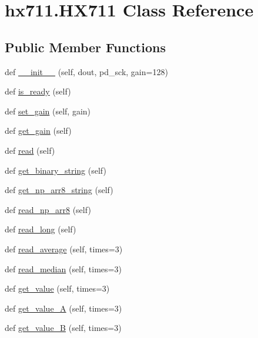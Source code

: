 \hypertarget{classhx711_1_1HX711}{}\section{hx711.\+H\+X711 Class Reference}
\label{classhx711_1_1HX711}
\subsection*{Public Member Functions}
\begin{DoxyCompactItemize}
\item 
def \hyperlink{classhx711_1_1HX711_ac3201a4ebefcbd6c940aeef1fb9091db}{\+\_\+\+\_\+init\+\_\+\+\_\+} (self, dout, pd\+\_\+sck, gain=128)
\item 
def \hyperlink{classhx711_1_1HX711_aa21bf76bdcbae0ee2d524c743385b183}{is\+\_\+ready} (self)
\item 
def \hyperlink{classhx711_1_1HX711_a5bd9ee578df2199446f2a1e01d37e7da}{set\+\_\+gain} (self, gain)
\item 
def \hyperlink{classhx711_1_1HX711_a43f366278bd30938be1996fbcfa44ec0}{get\+\_\+gain} (self)
\item 
def \hyperlink{classhx711_1_1HX711_a058945ca18a72069678eecbecbda8163}{read} (self)
\item 
def \hyperlink{classhx711_1_1HX711_acfc0c54486607da6813277dec303ea79}{get\+\_\+binary\+\_\+string} (self)
\item 
def \hyperlink{classhx711_1_1HX711_a9a014ef42240f63d6ce0829fbffed2c5}{get\+\_\+np\+\_\+arr8\+\_\+string} (self)
\item 
def \hyperlink{classhx711_1_1HX711_a915afbb08ddf74729d5bedd7ab1d934f}{read\+\_\+np\+\_\+arr8} (self)
\item 
def \hyperlink{classhx711_1_1HX711_a80e3ee545f81b32a3c3c9b446060b66e}{read\+\_\+long} (self)
\item 
def \hyperlink{classhx711_1_1HX711_a7b92aa87d496c118fcc3de2706b42f00}{read\+\_\+average} (self, times=3)
\item 
def \hyperlink{classhx711_1_1HX711_a8e769dcf2daebf051ca18b8dad4db6bd}{read\+\_\+median} (self, times=3)
\item 
def \hyperlink{classhx711_1_1HX711_a7cfa96e430088b6a40f3f3f342944faa}{get\+\_\+value} (self, times=3)
\item 
def \hyperlink{classhx711_1_1HX711_adc2094ba2da5b7667c6bc371d8587d2a}{get\+\_\+value\+\_\+A} (self, times=3)
\item 
def \hyperlink{classhx711_1_1HX711_a20ea4f05b17af2b5c3a1cf0a71781f07}{get\+\_\+value\+\_\+B} (self, times=3)

\end{DoxyCompactItemize}
